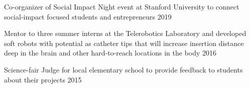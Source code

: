 


\begin{cvhonors}

  \cvhonor
    {Co-organizer} %
    { of Social Impact Night event at Stanford University to connect social-impact focused students and entrepreneurs} %
    {}
    {2019} %
    
  \cvhonor
    {Mentor} %
    {to three summer interns at the Telerobotics Laboratory and developed soft robots with potential as catheter tips that will increase insertion distance deep in the brain and other hard-to-reach locations in the body} %
    {}
    {2016} %
    
  \cvhonor
    {Science-fair Judge}
    {for local elementary school to provide feedback to students about their projects}
    {}
    {2015}
\end{cvhonors}
